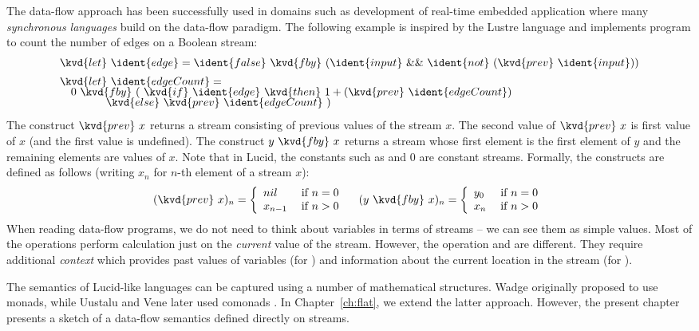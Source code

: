 The data-flow approach has been successfully used in domains such as development of real-time embedded 
application where many \emph{synchronous languages} \cite{app-synchronous-lang} build on the data-flow
paradigm. The following example is inspired by the Lustre \cite{app-synchronous-lustre} language
and implements program to count the number of edges on a Boolean stream:
%
\begin{equation*}
\begin{array}{l}
\kvd{let}~\ident{edge} = \ident{false}~\kvd{fby}~(\ident{input}~\&\&~\ident{not}~(\kvd{prev}~\ident{input}))
\\[0.5em]
\kvd{let}~\ident{edgeCount} = \\[-0.25em]
\quad 0~\kvd{fby}~ (~\kvd{if}~\ident{edge}~\kvd{then}~1 + (\kvd{prev}~\ident{edgeCount})\\[-0.25em]
\quad\quad\quad~~~\, \kvd{else}~\kvd{prev}~\ident{edgeCount} ~)
\end{array}
\end{equation*}
%
The construct $\kvd{prev}~x$ returns a stream consisting of previous values of the stream 
$x$. The second value of $\kvd{prev}~x$ is first value of $x$ (and the first
value is undefined). The construct $y~\kvd{fby}~x$ returns a stream whose first element is the 
first element of $y$ and the remaining elements are values of $x$. Note that in Lucid, the constants
such as  and $0$ are constant streams. Formally, the constructs are defined as follows
(writing $x_n$ for $n$-th element of a stream $x$):
%
\[ 
(\kvd{prev}~x)_n = \left\{ 
  \begin{array}{ll}
    nil     & \; \text{if $n=0$}\\
    x_{n-1} & \; \text{if $n>0$}
  \end{array} \right.
\quad
(y~\kvd{fby}~x)_n = \left\{ 
  \begin{array}{ll}
    y_0     & \; \text{if $n=0$}\\
    x_n     & \; \text{if $n>0$}
  \end{array} \right.
\]  
%
When reading data-flow programs, we do not need to think about variables in terms of streams --
we can see them as simple values. Most of the operations perform calculation just on the 
\emph{current} value of the stream. However, the operation  and  are different.
They require additional \emph{context} which provides past values of variables
(for ) and information about the current location in the stream (for ). 

The semantics of Lucid-like languages can be captured using a number of mathematical 
structures. Wadge \cite{app-lucid-monads} originally proposed to use monads, while Uustalu and 
Vene later used comonads \cite{app-dataflow-essence}. In Chapter~\ref{ch:flat}, we extend
the latter approach. However, the present chapter presents a sketch of a data-flow semantics
defined directly on streams.

